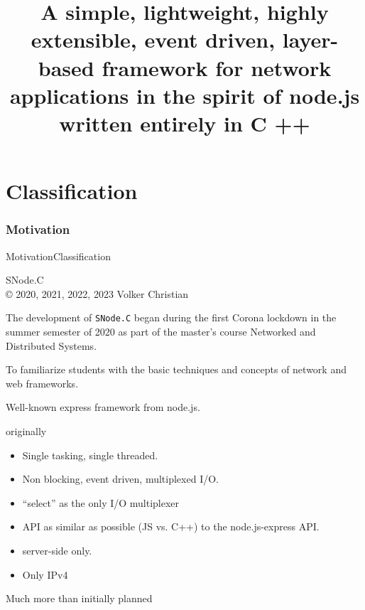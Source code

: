 ﻿\title[SNode.C]{\large A \alert{simple}, lightweight, highly extensible, event driven, layer-based framework for network applications in the spirit of \alert{node}.js written entirely in \alert{C }++}

\def\insertlecturepartnumbername{\href{https://github.com/SNodeC/snode.c}{\Huge\alert{SNode.C}}}


\part{Classification}
\section{Motivation}

\begin{frame}{Motivation}{Classification}
   \begin{center}
     \alert{\Huge \color{fh-ooe-red} SNode.C}\\\scriptsize\copyright{} 2020, 2021, 2022, 2023 Volker Christian\\
     \href{https://github.com/SNodeC/snode.c}{} \href{https://www.gnu.org/licenses /lgpl-3.0.en.html}{}
   \end{center}
   The development of \texttt{SNode.C} began during the first Corona lockdown in the summer semester of 2020 as part of the master's course \alert{Networked and
     Distributed Systems}.
   \begin{description}
     \item [\alert{Goal}] To familiarize students with the basic \alert{techniques and concepts of network and web frameworks}.
     \item [\alert{role model}] Well-known \alert{express} framework from \alert{node.js}.
     \item [\alert{Design decision}] originally
     \begin{itemize}
       \item Single tasking, single threaded.
       \item Non blocking, event driven, multiplexed I/O.
       \item "`select"' as the only I/O multiplexer
       \item API as similar as possible (JS vs. C++) to the node.js-express API.
       \item \alert{server-side} only.
       \item Only \alert{IPv4}
     \end{itemize}
     \item [\alert{Current status}] Much more than initially planned
   \end{description}
\end{frame}
